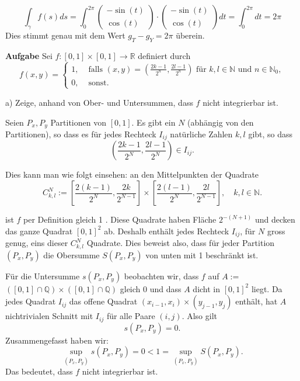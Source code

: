 $$
\int_{\gamma} f(s) d s=\int_{0}^{2 \pi}\left(\begin{array}{c}
-\sin (t) \\
\cos (t)
\end{array}\right) \cdot\left(\begin{array}{c}
-\sin (t) \\
\cos (t)
\end{array}\right) d t=\int_{0}^{2 \pi} d t=2 \pi
$$
Dies stimmt genau mit dem Wert $g_{T}-g_{Y}=2 \pi$ überein.

\hrulefill

\textbf{Aufgabe} Sei $f:[0,1] \times[0,1] \rightarrow \mathbb{R}$ definiert durch
$$
f(x, y)= \begin{cases}1, & \text { falls }(x, y)=\left(\frac{2 k-1}{2^{n}}, \frac{2 l-1}{2^{n}}\right) \text { für } k, l \in \mathbb{N} \text { und } n \in \mathbb{N}_{0}, \\ 0, & \text { sonst. }\end{cases}
$$

a) Zeige, anhand von Ober- und Untersummen, dass $f$ nicht integrierbar ist. \smallskip

Seien $P_x, P_y$ Partitionen von $[0,1]$. Es gibt ein $N$ (abhängig von den
Partitionen), so dass es für jedes Rechteck $I_{i j}$ natürliche Zahlen $k, l$ gibt, 
so dass
$$
\left(\frac{2 k-1}{2^{N}}, \frac{2 l-1}{2^{N}}\right) \in I_{i j} .
$$

Dies kann man wie folgt einsehen: an den Mittelpunkten der Quadrate
$$
C_{k, l}^{N}:=\left[\frac{2(k-1)}{2^{N}}, \frac{2 k}{2^{N-1}}\right] \times\left[\frac{2(l-1)}{2^{N}}, \frac{2 l}{2^{N-1}}\right], \quad k, l \in \mathbb{N} .
$$

ist $f$ per Definition gleich 1 . Diese Quadrate haben Fläche $2^{-(N+1)}$ und decken das ganze Quadrat $[0,1]^{2}$ ab. Deshalb enthält 
jedes Rechteck $I_{i j}$, für $N$ gross genug, eins dieser $C_{k, l}^{N}$ Quadrate. Dies beweist also, dass für jeder Partition 
$\left(P_{x}, P_{y}\right)$ die Obersumme $S\left(P_{x}, P_{y}\right)$ von unten mit 1 beschränkt ist. \smallskip 

Für die Untersumme $s\left(P_{x}, P_{y}\right)$ beobachten wir, dass $f$ auf $A:=$ $([0,1] \cap \mathbb{Q}) \times([0,1] \cap \mathbb{Q})$ gleich 0 und dass $A$ dicht in $[0,1]^{2}$ liegt. Da jedes Quadrat $I_{i j}$ das offene Quadrat $\left(x_{i-1}, x_{i}\right) \times\left(y_{j-1}, y_{j}\right)$ enthält, hat $A$ nichtrivialen Schnitt mit $I_{i j}$ für alle Paare $(i, j)$. Also gilt
$$
s\left(P_{x}, P_{y}\right)=0 .
$$
Zusammengefasst haben wir:
$$
\sup _{\left(P_{x}, P_{y}\right)} s\left(P_{x}, P_{y}\right)=0<1=\sup _{\left(P_{x}, P_{y}\right)} S\left(P_{x}, P_{y}\right) .
$$
Das bedeutet, dass $f$ nicht integrierbar ist. \smallskip


